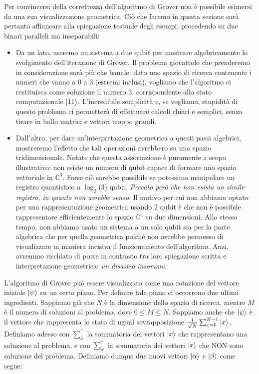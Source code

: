 \documentclass{book}
\theoremstyle{definition}
\theoremstyle{definition}
\theoremstyle{definition}
\theoremstyle{plain}
\theoremstyle{plain}
\theoremstyle{plain}
\theoremstyle{plain}
\begin{document}
Per convincersi della correttezza dell'algoritmo di Grover non è possibile esimersi da una sua visualizzazione geometrica. Ciò che faremo in questa sezione sarà pertanto affiancare alla spiegazione testuale degli esempi, procedendo su due binari paralleli ma inseparabili:
\begin{itemize}
    \item Da un lato, useremo un sistema a due qubit per mostrare algebricamente lo svolgimento dell'iterazione di Grover. Il problema giocattolo che prenderemo in considerazione sarà più che banale: dato uno spazio di ricerca contenente i numeri che vanno a 0 a 3 (estremi inclusi), vogliamo che l'algoritmo ci restituisca come soluzione il numero 3, corrispondente allo stato computazionale $\ket{11}$. L'incredibile semplicità e, se vogliamo, stupidità di questo problema ci permetterà di effettuare calcoli chiari e semplici, senza tirare in ballo matrici e vettori troppo grandi.
    \item Dall'altro, per dare un'interpretazione geometrica a questi passi algebrici, mostreremo l'effetto che tali operazioni avrebbero su uno spazio tridimensionale. Notate che questa associazione è puramente a scopo illustrativo: non esiste un numero di qubit capace di formare uno spazio vettoriale in $\mathbb{C}^3$.
    Forse ciò sarebbe possibile se potessimo manipolare un registro quantistico a $\log_2$(3) qubit. \emph{Peccato però che non esista un simile registro, in quanto non avrebbe senso}. Il motivo per cui non abbiamo optato per una rappresentazione geometrica usando 2 qubit è che non è possibile rappresentare efficientemente %
    lo spazio $\mathbb{C}^4$ su due dimensioni. Allo stesso tempo, non abbiamo usato un sistema a un solo qubit sia per la parte algebrica che per quella geometrica poiché non avrebbe permesso di visualizzare in maniera incisiva il funzionamento dell'algoritmo. Anzi, avremmo rischiato di porre in contrasto tra loro spiegazione scritta e interpretazione geometrica: \emph{un disastro insomma}.
\end{itemize}
L'algoritmo di Grover può essere visualizzato come una rotazione del vettore iniziale $\ket{\psi}$ su un certo piano. Per definire tale piano ci occorrono due ultimi ingredienti. Sappiamo già che $N$ è la dimensione dello spazio di ricerca, mentre $M$ è il numero di soluzioni al problema, dove $0 \leq M \leq N$. Sappiamo anche che $\ket{\psi}$ è il vettore che rappresenta lo stato di ugual sovrapposizione $\frac{1}{\sqrt{N}} \sum_{x=0}^{N-1}\ket{x}$. Definiamo adesso con $\sum^{'}_{x}$ la sommatoria dei vettori $\ket{x}$ che rappresentano una soluzione al problema, e con $\sum^{''}_{x}$ la sommatoria dei vettori $\ket{x}$ che NON sono soluzione del problema. Definiamo dunque due nuovi vettori $\ket{\alpha}$ e $\ket{\beta}$ come segue:
\end{document}
